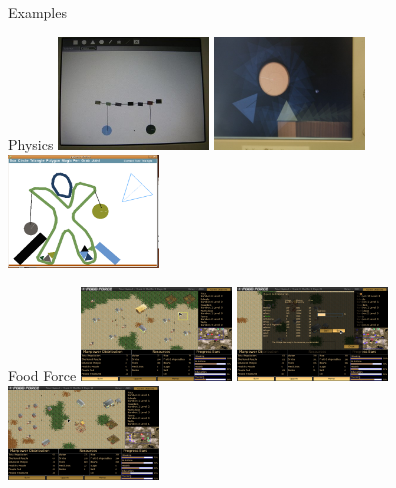 \documentclass[compress]{beamer}
\begin{document}
\begin{frame}{Examples}
\begin{block}{Physics}
    \centering
    \includegraphics[width=0.3\textwidth]{images/Bridgependulum.jpg}
    \hspace{0.5em}
    \includegraphics[width=0.3\textwidth]{images/Housegolf.jpg}
    \hspace{0.5em}
    \includegraphics[width=0.3\textwidth]{images/PhysicsNew3.png}
\end{block}
\pause
\begin{block}{Food Force}
    \centering
    \includegraphics[width=0.3\textwidth]{images/FoodForce2_Setup_Window.png}
    \hspace{0.5em}
    \includegraphics[width=0.3\textwidth]{images/FoodForce2_Market.png}
    \hspace{0.5em}
    \includegraphics[width=0.3\textwidth]{images/Foodforce-mp.png}
\end{block}
\end{frame}
\end{document}
